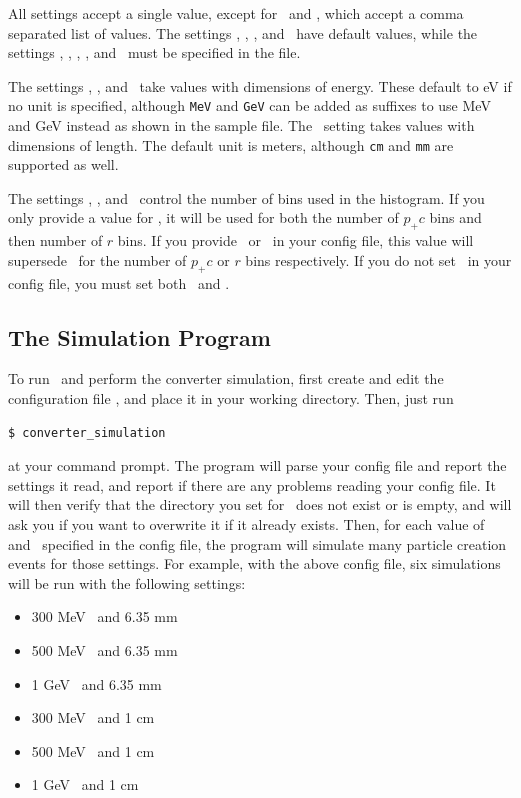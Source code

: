 \documentclass[12pt]{article}
\begin{document}
All settings accept a single value, except for \pcin \, and \targett, which accept a comma separated list of values.
The settings \outpcmin, \outdir, \numbins, and \fitxpt \, have default values, while the settings \targetm, \targett, \pcin, \outpcmax, and \dxydsmax \, must be specified in the file.

The settings \pcin, \outpcmin, and \outpcmax \, take values with dimensions of energy.
These default to eV if no unit is specified, although \texttt{MeV} and \texttt{GeV} can be added as suffixes to use MeV and GeV instead as shown in the sample file.
The \targett \, setting takes values with dimensions of length.
The default unit is meters, although \texttt{cm} and \texttt{mm} are supported as well.

The settings \numbins, \numpcbins, and \numrbins \, control the number of bins used in the histogram.
If you only provide a value for \numbins, it will be used for both the number of $p_+c$ bins and then number of $r$ bins.
If you provide \numpcbins \, or \numrbins \, in your config file, this value will supersede \numbins \, for the number of $p_+ c$ or $r$ bins respectively.
If you do not set \numbins \, in your config file, you must set both \numpcbins \, and \numrbins.

\subsection{The Simulation Program}

To run \exes \, and perform the converter simulation, first create and edit the configuration file \configfile, and place it in your working directory.
Then, just run
\begin{verbatim}
$ converter_simulation
\end{verbatim}
at your command prompt.  The program will parse your config file and report the settings it read,
and report if there are any problems reading your config file.  It will then verify that the
directory you set for \outdir \, does not exist or is empty, and will ask you if you want to
overwrite it if it already exists.  Then, for each value of \pcin \, and \targett \, specified in
the config file, the program will simulate many particle creation events for those settings.  For example,
with the above config file, six simulations will be run with the following settings:
\begin{itemize}
\item
300 MeV \pcin \, and 6.35 mm \targett

\item
500 MeV \pcin \, and 6.35 mm \targett

\item
1 GeV \pcin \, and 6.35 mm \targett

\item
300 MeV \pcin \, and 1 cm \targett

\item
500 MeV \pcin \, and 1 cm \targett

\item
1 GeV \pcin \, and 1 cm \targett
\end{itemize}
\end{document}
